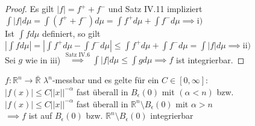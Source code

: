   \begin{proof}
    Es gilt $|f| = f^+ + f^-$ und Satz IV.11 impliziert $\int |f| d\mu = \int (f^+ + f^-) d\mu = \int f^+ d\mu + \int f^- d\mu \implies \text{i)} $ \\
    Ist $\int f d\mu$ definiert, so gilt $| \int f d\mu | = |\int f^+ d\mu - \int f^- d\mu | \leq \int f^+ d\mu + \int f^- d\mu = \int |f| d\mu \implies \text{ii)}$ \\
    Sei $g$ wie in iii) $\overset{\text{Satz IV.6}}{\implies} \int |f| d\mu \leq \int g d\mu \implies f$ ist integrierbar. 
  \end{proof}

  \begin{example}
    $f: \mathbb{R}^n \to \bar{\mathbb{R}}$ $\lambda^n$-messbar und es gelte für ein $C \in [0, \infty]$:\\
    $|f(x)| \leq C ||x||^{-\alpha}$ fast überall in $B_{\epsilon}(0)$ mit $(\alpha < n)$ bzw.\\
    $|f(x)| \leq C ||x||^{-\alpha}$ fast überall in $\mathbb{R}^n \setminus B_{\epsilon}(0)$ mit $\alpha > n$\\
    $\implies f$ ist auf $B_{\epsilon}(0)$ bzw. $\mathbb{R}^n \setminus B_{\epsilon}(0)$ integrierbar
  \end{example}

  